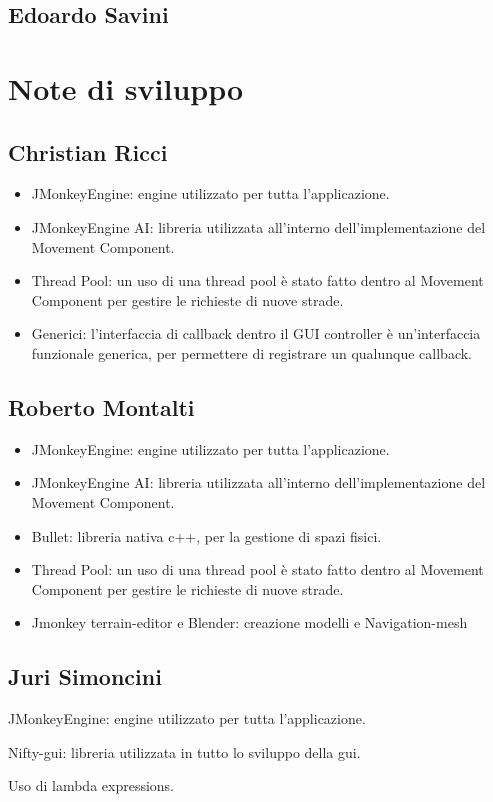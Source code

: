 \subsection{Edoardo Savini}

\section{Note di sviluppo}

\subsection{Christian Ricci}

\begin{itemize}
\item JMonkeyEngine: engine utilizzato per tutta l'applicazione.
\item JMonkeyEngine AI: libreria utilizzata all'interno dell'implementazione del Movement Component.
\item Thread Pool: un uso di una thread pool è stato fatto dentro al Movement Component per gestire le richieste di nuove strade.
\item Generici: l'interfaccia di callback dentro il GUI controller è un'interfaccia funzionale generica, per permettere di registrare un qualunque callback.
\end{itemize}

\subsection{Roberto Montalti}

\begin{itemize}
\item JMonkeyEngine: engine utilizzato per tutta l'applicazione.
\item JMonkeyEngine AI: libreria utilizzata all'interno dell'implementazione del Movement Component.
\item Bullet: libreria nativa c++, per la gestione di spazi fisici.
\item Thread Pool: un uso di una thread pool è stato fatto dentro al Movement Component per gestire le richieste di nuove strade.
\item Jmonkey terrain-editor e Blender: creazione modelli e Navigation-mesh 
\end{itemize}


\subsection{Juri Simoncini}
\item JMonkeyEngine: engine utilizzato per tutta l'applicazione.
\item Nifty-gui: libreria utilizzata in tutto lo sviluppo della gui.
\item Uso di lambda expressions.

